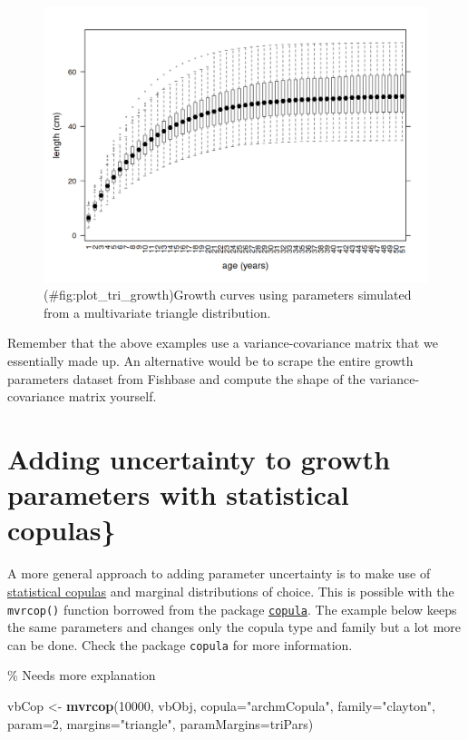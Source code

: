 \documentclass[
]{book}
\newenvironment{Shaded}{\begin{snugshade}}{\end{snugshade}}
\newcommand{\AttributeTok}[1]{\textcolor[rgb]{0.13,0.29,0.53}{#1}}
\newcommand{\DecValTok}[1]{\textcolor[rgb]{0.00,0.00,0.81}{#1}}
\newcommand{\FunctionTok}[1]{\textcolor[rgb]{0.13,0.29,0.53}{\textbf{#1}}}
\newcommand{\NormalTok}[1]{#1}
\newcommand{\OtherTok}[1]{\textcolor[rgb]{0.56,0.35,0.01}{#1}}
\newcommand{\StringTok}[1]{\textcolor[rgb]{0.31,0.60,0.02}{#1}}
\begin{document}
\begin{figure}
\centering
\includegraphics{_bookdown_files/_main_files/figure-html/plot_tri_growth-1.png}
\caption{(\#fig:plot\_tri\_growth)Growth curves using parameters simulated from a multivariate triangle distribution.}
\end{figure}

Remember that the above examples use a variance-covariance matrix that we essentially made up. An alternative would be to scrape the entire growth parameters dataset from Fishbase and compute the shape of the variance-covariance matrix yourself.

\hypertarget{adding-uncertainty-to-growth-parameters-with-statistical-copulas}{%
\section{Adding uncertainty to growth parameters with statistical copulas\}}\label{adding-uncertainty-to-growth-parameters-with-statistical-copulas}}

A more general approach to adding parameter uncertainty is to make use of \href{http://www.encyclopediaofmath.org/index.php/Copula}{statistical copulas} and marginal distributions of choice. This is possible with the \texttt{mvrcop()} function borrowed from the package \href{http://cran.r-project.org/web/packages/copula/}{\texttt{copula}}. The example below keeps the same parameters and changes only the copula type and family but a lot more can be done. Check the package \texttt{copula} for more information.

\% Needs more explanation

\begin{Shaded}
\begin{Highlighting}[]
\NormalTok{vbCop }\OtherTok{\textless{}{-}} \FunctionTok{mvrcop}\NormalTok{(}\DecValTok{10000}\NormalTok{, vbObj, }\AttributeTok{copula=}\StringTok{"archmCopula"}\NormalTok{, }\AttributeTok{family=}\StringTok{"clayton"}\NormalTok{, }\AttributeTok{param=}\DecValTok{2}\NormalTok{, }
                \AttributeTok{margins=}\StringTok{"triangle"}\NormalTok{, }\AttributeTok{paramMargins=}\NormalTok{triPars)}
\end{Highlighting}
\end{Shaded}
\end{document}

